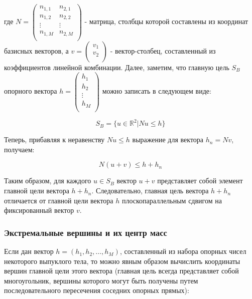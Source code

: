 \documentclass[a4paper, 12pt, titlepage]{article}
\theoremstyle{definition}
\theoremstyle{plain}
\theoremstyle{plain}
\begin{document}
где $N = \left(
     \begin{array}{cc}
      n_{1, 1} & n_{2, 1} \\
      n_{1, 2} & n_{2, 2} \\
      \vdots & \vdots \\
      n_{1, M} & n_{2, M} \\
     \end{array}
     \right)$ - матрица, столбцы которой составлены из координат базисных
векторов, а
$v = \left(
     \begin{array}{c}
      v_{1} \\
      v_{2} \\
     \end{array}
     \right)$ - вектор-столбец, составленный из коэффициентов линейной
комбинации. Далее, заметим, что главную цель $S_{B}$ опорного вектора
$h = \left(
  \begin{array}{c}
   h_{1} \\
   h_{2} \\
   \vdots \\
   h_{M} \\
  \end{array}
  \right)$ можно записать в следующем виде:

\begin{equation}
S_{B} = \{u \in \mathbb{R}^{2} | N u \leq h\}
\end{equation}

Теперь, прибавляя к неравенству $N u \leq h$ выражение для вектора
$h_{n} = N v$, получаем:

\begin{equation}
N (u + v) \leq h + h_{n}
\end{equation}

Таким образом, для каждого $u \in S_{B}$ вектор $u + v$ представляет собой
элемент главной цели вектора $h + h_{n}$. Следовательно, главная цель вектора
$h + h_{n}$ отличается от главной цели вектора $h$ плоскопараллельным сдвигом на
фиксированный вектор $v$.

\subsubsection{Экстремальные вершины и их центр масс}

Если дан вектор $h = (h_{1}, h_{2}, \ldots, h_{M})$, составленный из набора
опорных чисел некоторого выпуклого тела, то можно явным образом вычислить
координаты вершин главной цели этого вектора (главная цель всегда представляет
собой многоугольник, вершины которого могут быть получены путем
последовательного пересечения соседних опорных прямых):
\end{document}
